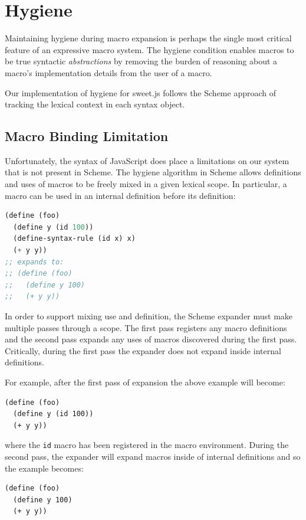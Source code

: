 \documentclass[preprint,10pt]{sigplanconf}
\begin{document}

\section{Hygiene}
\label{sec:hygiene}

Maintaining hygiene during macro expansion is perhaps the single most
critical feature of an expressive macro system. The hygiene condition
enables macros to be true syntactic \emph{abstractions} by removing
the burden of reasoning about a macro's implementation details from the
user of a macro.

Our implementation of hygiene for sweet.js follows the Scheme approach
\cite{Hieb1992,Flatt2012} of tracking the lexical context in each
syntax object.

\subsection{Macro Binding Limitation} 
\label{sec:macroBinding}

Unfortunately, the syntax of JavaScript does place a limitations on
our system that is not present in Scheme. The hygiene algorithm in
Scheme allows definitions and uses of macros to be freely mixed in a
given lexical scope. In particular, a macro can be used in an internal
definition before its definition:

\begin{lstlisting}[language=lisp]
(define (foo)
  (define y (id 100))
  (define-syntax-rule (id x) x)
  (+ y y))
;; expands to:
;; (define (foo)
;;   (define y 100)
;;   (+ y y))
\end{lstlisting}

In order to support mixing use and definition, the Scheme expander
must make multiple passes through a scope. The first pass registers
any macro definitions and the second pass expands any uses of macros
discovered during the first pass. Critically, during the first
pass the expander does not expand inside internal definitions.

For example, after the first pass of expansion the above example will become:
\begin{lstlisting}
(define (foo)
  (define y (id 100))
  (+ y y))
\end{lstlisting}
where the \verb!id! macro has been registered in the macro
environment. During the second pass, the expander will expand macros
inside of internal definitions and so the example becomes:
\begin{lstlisting}
(define (foo)
  (define y 100)
  (+ y y))
\end{lstlisting}
\end{document}
